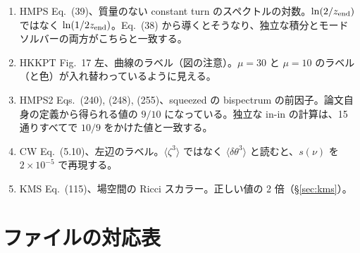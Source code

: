 \documentclass[a4paper,11pt]{ltjsarticle}
\begin{document}
\begin{enumerate}
\item HMPS Eq.~(39)\cite{HMPS2026}、質量のない constant turn のスペクトルの対数。$\ln(2/z_{\rm end})$ ではなく $\ln(1/2z_{\rm end})$。Eq.~(38) から導くとそうなり、独立な積分とモードソルバーの両方がこちらと一致する。
\item HKKPT Fig.~17 左、曲線のラベル（図の注意）。$\mu=30$ と $\mu=10$ のラベル（と色）が入れ替わっているように見える。
\item HMPS2 Eqs.~(240), (248), (255)\cite{HMPS2026b}、squeezed の bispectrum の前因子。論文自身の定義から得られる値の $9/10$ になっている。独立な in-in の計算は、15 通りすべてで $10/9$ をかけた値と一致する。
\item CW Eq.~(5.10)\cite{ChenWang2010}、左辺のラベル。$\langle\zeta^3\rangle$ ではなく $\langle\delta\theta^3\rangle$ と読むと、$s(\nu)$ を $2\times10^{-5}$ で再現する。
\item KMS Eq.~(115)\cite{KMS2013}、場空間の Ricci スカラー。正しい値の 2 倍（\S\ref{sec:kms}）。
\end{enumerate}

\section{ファイルの対応表}
\end{document}
